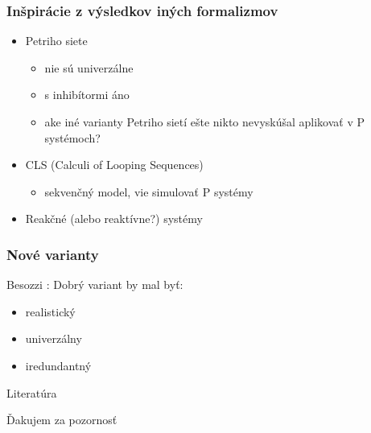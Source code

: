 \begin{frame}[t]\frametitle{Inšpirácie z výsledkov iných formalizmov}
\begin{itemize}
  \item Petriho siete
  \begin{itemize}
    \item nie sú univerzálne
    \item s inhibítormi áno
    \item ake iné varianty Petriho sietí ešte nikto nevyskúšal aplikovať v P systémoch?
  \end{itemize}
  \item CLS (Calculi of Looping Sequences)
  \begin{itemize}
    \item sekvenčný model, vie simulovať P systémy \cite{Barbuti07CLS}
  \end{itemize}
  \item Reakčné (alebo reaktívne?) systémy
\end{itemize}
\end{frame}
\note{}

\begin{frame}[t]\frametitle{Nové varianty}
Besozzi \cite{Besozzi:PhD:2004}: Dobrý variant by mal byť:
\begin{itemize}
  \item realistický
  \item univerzálny
  \item iredundantný
\end{itemize}
\end{frame}
\note{}



\begin{frame}[allowframebreaks]{Literatúra}


\end{frame}

\begin{frame}[plain]
\begin{center}
  Ďakujem za pozornosť
\end{center}
\end{frame}

